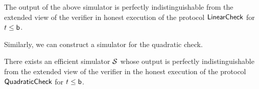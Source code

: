 \begin{comment}
The simulator outputs $r$, $\{j_u,k_u\}_{u\in [t]}$,
$\beta$, $\tau,\delta$, $\rho$, $\tilde{\tau},\tilde{\delta}$ by uniformly and
independently sampling them from their respective domains, as in the honest
execution of the protocol. Simulator also outputs $z,\tilde{z}$ uniformly from
$L_2$, and $z'$ uniformly from $\dashL_2$ satisfying $\sum_{j\in [m]}z'[j]=0$ . It outputs
$\ewit[\cdot,\cdot,k_u]$ uniformly such that each plane has columns as codewords
in $L_2$. 
Next, the simulator outputs $\omega,\nu,\tilde{\nu}$
and $\chi_1,\ldots,\chi_t$, $\{O[\cdot,k_u]\}_{u\in [t]}$ choosing them randomly and
independently from $\FF$. Finally, the simulator outputs
$c_0,d_0,\ldots,c_{s+\ell}$ and $\tilde{d}_0,\tilde{c}_1,\ldots,\tilde{c}_\ell$ choosing 
them uniformly from $\GG$ subject to the following constraints:
$d_0 + \sum_{a=1}^{s+\ell}\mu_ac_a = \comm(z,\nu)$,
$c_0 + \sum_{a=1}^{s+\ell}\varphi_ac_a = \comm(z',\omega)$,
$\sum_{a=1}^{s+\ell}T[a,k_u]c_a = \comm(P[\cdot,k_u],\chi_u)$ for $u\in [t]$,
$\sum_{a=1}^{\ell}\mc{T}[a,k_u]\tilde{c}_a = \comm\big(\sum_{i\in
[p]}\tilde{U}[\cdot,k_u],\tilde{O}[\cdot, k_u]\big)$ for $u\in [t]$,
$\beta\tilde{d}_0 + \sum_{a=1}^{\ell}\tilde{\mu}_a\tilde{c}_a =
\comm(\tilde{z},\tilde{\nu})$. 
\end{comment}
\begin{lemma}\label{lem:simlincheck}
The output of the above simulator is perfectly indistinguishable
from the extended view of the verifier in honest execution of the protocol
$\mathsf{LinearCheck}$ for $t\leq \mathsf{b}$.
\end{lemma}

Similarly, we can construct a simulator for the quadratic check.
\begin{lemma}\label{lem:simquadcheck}
There exists an efficient simulator $\mathcal{S}$ whose output is perfectly
indistinguishable from the extended view of the verifier in the honest execution
of the protocol $\mathsf{QuadraticCheck}$ for $t\leq \mathsf{b}$.
\end{lemma}


